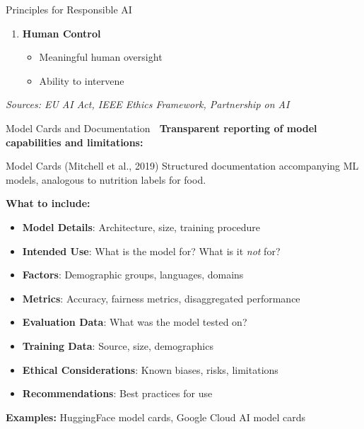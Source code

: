 \documentclass[aspectratio=169]{beamer}
\begin{document}
\begin{frame}[shrink=10]{Principles for Responsible AI 📜}
\begin{enumerate}
    \item \textbf{Human Control}
    \begin{itemize}\setlength{\itemsep}{0pt}
        \item Meaningful human oversight
        \item Ability to intervene
    \end{itemize}
\end{enumerate}

\vspace{0.3em}

\small
\textit{Sources: EU AI Act, IEEE Ethics Framework, Partnership on AI}
\end{frame}

\begin{frame}[shrink=10]{Model Cards and Documentation 📄}
\small
\textbf{Transparent reporting of model capabilities and limitations:}

\vspace{0.5em}

\begin{block}{Model Cards (Mitchell et al., 2019)}
Structured documentation accompanying ML models, analogous to nutrition labels for food.
\end{block}

\vspace{0.5em}

\textbf{What to include:}
\begin{itemize}\setlength{\itemsep}{0pt}
    \item \textbf{Model Details}: Architecture, size, training procedure
    \item \textbf{Intended Use}: What is the model for? What is it \textit{not} for?
    \item \textbf{Factors}: Demographic groups, languages, domains
    \item \textbf{Metrics}: Accuracy, fairness metrics, disaggregated performance
    \item \textbf{Evaluation Data}: What was the model tested on?
    \item \textbf{Training Data}: Source, size, demographics
    \item \textbf{Ethical Considerations}: Known biases, risks, limitations
    \item \textbf{Recommendations}: Best practices for use
\end{itemize}

\vspace{0.3em}

\textbf{Examples:} HuggingFace model cards, Google Cloud AI model cards
\end{frame}
\end{document}
